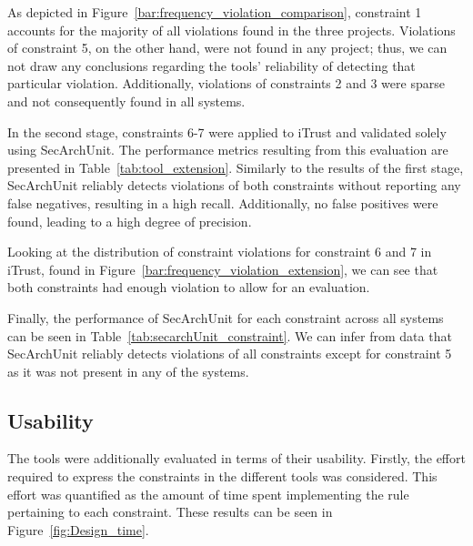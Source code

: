 As depicted in Figure~\ref{bar:frequency_violation_comparison}, constraint 1 accounts for the majority of all violations found in the three projects. Violations of constraint 5, on the other hand, were not found in any project; thus, we can not draw any conclusions regarding the tools' reliability of detecting that particular violation. Additionally, violations of constraints 2 and 3 were sparse and not consequently found in all systems.



In the second stage, constraints 6-7 were applied to iTrust and validated solely using SecArchUnit. The performance metrics resulting from this evaluation are presented in Table~\ref{tab:tool_extension}. Similarly to the results of the first stage, SecArchUnit reliably detects violations of both constraints without reporting any false negatives, resulting in a high recall.  Additionally, no false positives were found, leading to a high degree of precision.



Looking at the distribution of constraint violations for constraint 6 and 7 in iTrust, found in Figure~\ref{bar:frequency_violation_extension}, we can see that both constraints had enough violation to allow for an evaluation. 



Finally, the performance of SecArchUnit for each constraint across all systems can be seen in Table~\ref{tab:secarchUnit_constraint}. We can infer from data that SecArchUnit reliably detects violations of all constraints except for constraint 5 as it was not present in any of the systems. 



\subsection{Usability} 
The tools were additionally evaluated in terms of their usability. Firstly, the effort required to express the constraints in the different tools was considered. This effort was quantified as the amount of time spent implementing the rule pertaining to each constraint. These results can be seen in Figure~\ref{fig:Design_time}.




